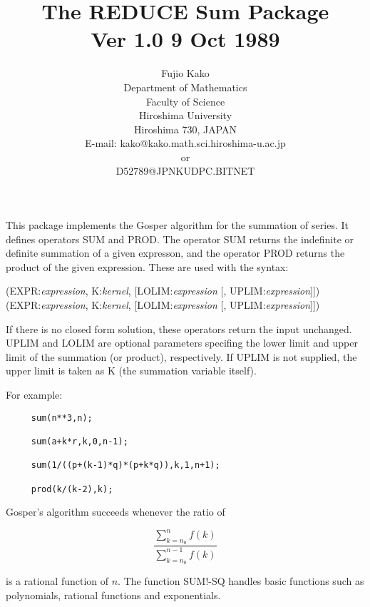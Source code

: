 \title{The REDUCE Sum Package \\ Ver 1.0 9 Oct 1989}
\date{}
\author{Fujio Kako \\ Department of Mathematics \\ Faculty of Science \\
Hiroshima University \\ Hiroshima 730, JAPAN \\
E-mail: kako@kako.math.sci.hiroshima-u.ac.jp \\ or \\
D52789@JPNKUDPC.BITNET}

\maketitle
This package implements the Gosper algorithm for the summation of series.
It defines operators SUM and PROD.  The operator SUM returns the indefinite
or definite summation of a given expresson, and the operator PROD returns
the product of the given expression.  These are used with the syntax:

\vspace{.1in}
(EXPR:{\em expression}, K:{\em kernel}, [LOLIM:{\em expression} [, UPLIM:{\em expression}]])
\vspace{.1in}
(EXPR:{\em expression}, K:{\em kernel}, [LOLIM:{\em expression} [, UPLIM:{\em expression}]])
\vspace{.1in}

If there is no closed form solution, these operators return the input
unchanged.  UPLIM and LOLIM are optional parameters specifing the lower
limit and upper limit of the summation (or product), respectively.  If UPLIM
is not supplied, the upper limit is taken as K (the summation variable
itself).

For example:

\begin{verbatim}
     sum(n**3,n);

     sum(a+k*r,k,0,n-1);

     sum(1/((p+(k-1)*q)*(p+k*q)),k,1,n+1);

     prod(k/(k-2),k);
\end{verbatim}

Gosper's algorithm succeeds whenever the ratio of

\[ \frac{\sum_{k=n_0}^n f(k)}{\sum_{k=n_0}^{n-1} f(k)} \]

\noindent is a rational function of $n$.  The function SUM!-SQ
handles basic functions such as polynomials, rational functions and
exponentials.


